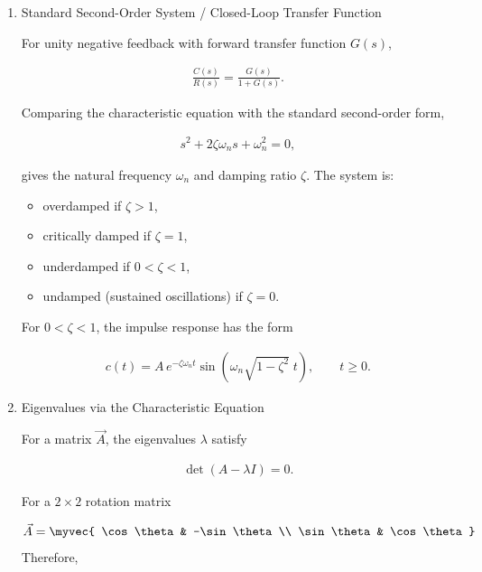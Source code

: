 \begin{enumerate}[label=\thesubsection.\arabic*,ref=\thesubsection.\theenumi]
Contrapositive form: if $f'(x)\neq 0$ for all $x$, then
$f(a)\neq f(b)$ for $a\neq b$.

\item Standard Second-Order System / Closed-Loop Transfer Function

For unity negative feedback with forward transfer function $G(s)$,

\begin{align}
\frac{C(s)}{R(s)}=\frac{G(s)}{1+G(s)}. \label{neg}
\end{align}

Comparing the characteristic equation with the standard second-order
form,

\begin{align}
s^{2}+2\zeta\omega_n s+\omega_n^{2}=0,
\end{align}

gives the natural frequency $\omega_n$ and damping ratio $\zeta$.
The system is:

\begin{itemize} \label{compare}
\item overdamped if $\zeta>1$,
\item critically damped if $\zeta=1$,
\item underdamped if $0<\zeta<1$,
\item undamped (sustained oscillations) if $\zeta=0$.
\end{itemize}

For $0<\zeta<1$, the impulse response has the form

\begin{align}
c(t)=A\,e^{-\zeta\omega_n t}\sin\!\left(\omega_n\sqrt{1-\zeta^{2}}\;t\right),
\qquad t\ge 0. \label{inverse}
\end{align}

\item Eigenvalues via the Characteristic Equation \label{eigen}

For a matrix $\vec{A}$, the eigenvalues $\lambda$ satisfy

\begin{align}
\det(A-\lambda I)=0.
\end{align}

For a $2\times2$ rotation matrix

\begin{align}
\vec{A}=\myvec{
\cos\theta & -\sin\theta\\
\sin\theta & \cos\theta
}
\end{align}
Therefore,


\end{enumerate}
